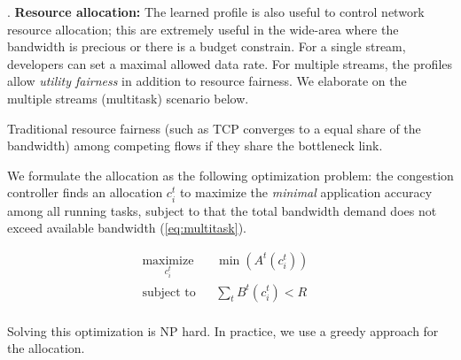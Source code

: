 %     

\vspace{1em}\noindent {}. \textbf{Resource
  allocation:} The learned profile is also useful to control network resource
allocation; this are extremely useful in the wide-area where the bandwidth is
precious or there is a budget constrain. For a single stream, developers can set
a maximal allowed data rate. For multiple streams, the profiles allow
\textit{utility fairness} in addition to resource fairness. We elaborate on the
multiple streams (multitask) scenario below.

Traditional resource fairness (such as TCP converges to a equal share of the
bandwidth) among competing flows if they share the bottleneck link.


We formulate the allocation as the following optimization problem: the
congestion controller finds an allocation $c_i^t$ to maximize the
\textit{minimal} application accuracy among all running tasks, subject to that
the total bandwidth demand does not exceed available bandwidth
(\autoref{eq:multitask}).

\begin{equation}
  \label{eq:multitask}
  \begin{aligned}
    & \underset{c_i^t}{\text{maximize}} & & \min({A^t(c_i^t)}) & & \\
    & \text{subject to} & & \sum_t{B^t(c_i^t)} < R & & \\
  \end{aligned}
\end{equation}

Solving this optimization is NP hard. In practice, we use a greedy approach for
the allocation.

